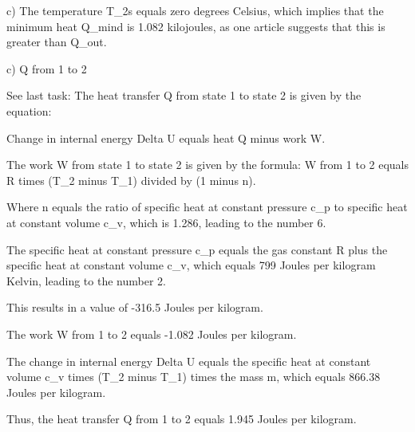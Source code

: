 c) The temperature T_2s equals zero degrees Celsius, which implies that the minimum heat Q_mind is 1.082 kilojoules, as one article suggests that this is greater than Q_out.

c) Q from 1 to 2

See last task:
The heat transfer Q from state 1 to state 2 is given by the equation:

Change in internal energy Delta U equals heat Q minus work W.

The work W from state 1 to state 2 is given by the formula:
W from 1 to 2 equals R times (T_2 minus T_1) divided by (1 minus n).

Where n equals the ratio of specific heat at constant pressure c_p to specific heat at constant volume c_v, which is 1.286, leading to the number 6.

The specific heat at constant pressure c_p equals the gas constant R plus the specific heat at constant volume c_v, which equals 799 Joules per kilogram Kelvin, leading to the number 2.

This results in a value of -316.5 Joules per kilogram.

The work W from 1 to 2 equals -1.082 Joules per kilogram.

The change in internal energy Delta U equals the specific heat at constant volume c_v times (T_2 minus T_1) times the mass m, which equals 866.38 Joules per kilogram.

Thus, the heat transfer Q from 1 to 2 equals 1.945 Joules per kilogram.